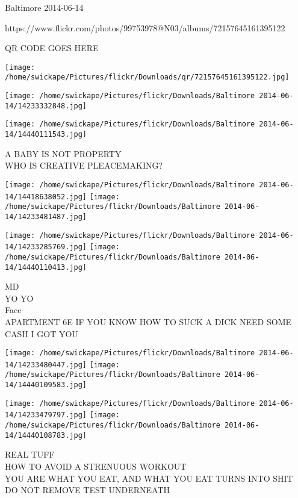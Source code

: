 \documentclass[10pt,letterpaper]{article}
\begin{document}
Baltimore 2014-06-14

https://www.flickr.com/photos/99753978@N03/albums/72157645161395122

QR CODE GOES HERE

\texttt{[image: /home/swickape/Pictures/flickr/Downloads/qr/72157645161395122.jpg]}
\pagebreak

\texttt{[image: /home/swickape/Pictures/flickr/Downloads/Baltimore 2014-06-14/14233332848.jpg]}

\vspace{0.25in}
\texttt{[image: /home/swickape/Pictures/flickr/Downloads/Baltimore 2014-06-14/14440111543.jpg]}

A BABY IS NOT PROPERTY\\
WHO IS CREATIVE PLEACEMAKING?\\
\pagebreak

\texttt{[image: /home/swickape/Pictures/flickr/Downloads/Baltimore 2014-06-14/14418638052.jpg]}
\texttt{[image: /home/swickape/Pictures/flickr/Downloads/Baltimore 2014-06-14/14233481487.jpg]}

\texttt{[image: /home/swickape/Pictures/flickr/Downloads/Baltimore 2014-06-14/14233285769.jpg]}
\texttt{[image: /home/swickape/Pictures/flickr/Downloads/Baltimore 2014-06-14/14440110413.jpg]}

MD\\
YO YO\\
Face\\
APARTMENT 6E IF YOU KNOW HOW TO SUCK A DICK NEED SOME CASH I GOT YOU\\
\pagebreak

\texttt{[image: /home/swickape/Pictures/flickr/Downloads/Baltimore 2014-06-14/14233480447.jpg]}
\texttt{[image: /home/swickape/Pictures/flickr/Downloads/Baltimore 2014-06-14/14440109583.jpg]}

\texttt{[image: /home/swickape/Pictures/flickr/Downloads/Baltimore 2014-06-14/14233479797.jpg]}
\texttt{[image: /home/swickape/Pictures/flickr/Downloads/Baltimore 2014-06-14/14440108783.jpg]}

REAL TUFF\\
HOW TO AVOID A STRENUOUS WORKOUT\\
YOU ARE WHAT YOU EAT, AND WHAT YOU EAT TURNS INTO SHIT\\
DO NOT REMOVE TEST UNDERNEATH\\
\pagebreak
\end{document}
